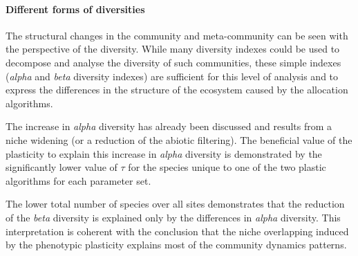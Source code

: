 \paragraph{Different forms of diversities}

The structural changes in the community and meta-community can be seen with the perspective of the diversity. While many diversity indexes could be used to decompose and analyse the diversity of such communities, these simple indexes (\textit{alpha} and \textit{beta} diversity indexes) are sufficient for this level of analysis and to express the differences in the structure of the ecosystem caused by the allocation algorithms.

The increase in \textit{alpha} diversity has already been discussed and results from a niche widening (or a reduction of the abiotic filtering). The beneficial value of the plasticity to explain this increase in \textit{alpha} diversity is demonstrated by the significantly lower value of $\tau$ for the species unique to one of the two plastic algorithms for each parameter set. 


The lower total number of species over all sites demonstrates that the reduction of the \textit{beta} diversity is explained only by the differences in \textit{alpha} diversity. This interpretation is coherent with the conclusion that the niche overlapping induced by the phenotypic plasticity explains most of the community dynamics patterns.


